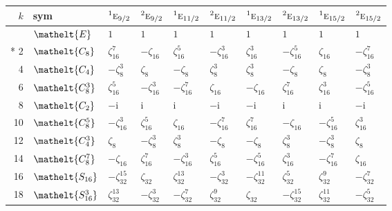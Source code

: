 \documentclass[10pt,a4paper]{article}
\numberwithin{equation}{section}
\newcommand{\eltfont}[1]{{\let\sigma\eltsigma\mathelt{#1}}}
\newcommand{\irr}[1]{\text{\normalfont\scshape #1}}
\newcommand{\conjpair}[1]{{}^{#1}}
\newcommand{\cls}[1]{\eltfont{#1}}
\newcommand{\iunit}{\mathrm{i}}
\newcommand{\rootunity}[1]{\zeta_{#1}}
\begin{document}
{\small\setlength{\tabcolsep}{4pt}
\begin{longtable}{@{}rlllllllll@{}}\toprule
$k$ & sym & $\conjpair{1}\irr{e}_{9/2}$ & $\conjpair{2}\irr{e}_{9/2}$ & $\conjpair{1}\irr{e}_{11/2}$ & $\conjpair{2}\irr{e}_{11/2}$ & $\conjpair{1}\irr{e}_{13/2}$ & $\conjpair{2}\irr{e}_{13/2}$ & $\conjpair{1}\irr{e}_{15/2}$ & $\conjpair{2}\irr{e}_{15/2}$\\\midrule\endhead
\bottomrule\endfoot\endlastfoot
0 & $\cls{E}$ & $1$ & $1$ & $1$ & $1$ & $1$ & $1$ & $1$ & $1$\\*
2 & $\cls{C_{8}}$ & $\rootunity{16}^{7}$ & $-\rootunity{16}$ & $\rootunity{16}^{5}$ & $-\rootunity{16}^{3}$ & $\rootunity{16}^{3}$ & $-\rootunity{16}^{5}$ & $\rootunity{16}$ & $-\rootunity{16}^{7}$\\
4 & $\cls{C_{4}}$ & $-\rootunity{8}^{3}$ & $\rootunity{8}$ & $-\rootunity{8}$ & $\rootunity{8}^{3}$ & $\rootunity{8}^{3}$ & $-\rootunity{8}$ & $\rootunity{8}$ & $-\rootunity{8}^{3}$\\
6 & $\cls{C_{8}^{3}}$ & $\rootunity{16}^{5}$ & $-\rootunity{16}^{3}$ & $-\rootunity{16}^{7}$ & $\rootunity{16}$ & $-\rootunity{16}$ & $\rootunity{16}^{7}$ & $\rootunity{16}^{3}$ & $-\rootunity{16}^{5}$\\
8 & $\cls{C_{2}}$ & $-\iunit{}$ & $\iunit{}$ & $\iunit{}$ & $-\iunit{}$ & $-\iunit{}$ & $\iunit{}$ & $\iunit{}$ & $-\iunit{}$\\
10 & $\cls{C_{8}^{5}}$ & $-\rootunity{16}^{3}$ & $\rootunity{16}^{5}$ & $\rootunity{16}$ & $-\rootunity{16}^{7}$ & $\rootunity{16}^{7}$ & $-\rootunity{16}$ & $-\rootunity{16}^{5}$ & $\rootunity{16}^{3}$\\
12 & $\cls{C_{4}^{3}}$ & $\rootunity{8}$ & $-\rootunity{8}^{3}$ & $\rootunity{8}^{3}$ & $-\rootunity{8}$ & $-\rootunity{8}$ & $\rootunity{8}^{3}$ & $-\rootunity{8}^{3}$ & $\rootunity{8}$\\
14 & $\cls{C_{8}^{7}}$ & $-\rootunity{16}$ & $\rootunity{16}^{7}$ & $-\rootunity{16}^{3}$ & $\rootunity{16}^{5}$ & $-\rootunity{16}^{5}$ & $\rootunity{16}^{3}$ & $-\rootunity{16}^{7}$ & $\rootunity{16}$\\
16 & $\cls{S_{16}}$ & $-\rootunity{32}^{15}$ & $\rootunity{32}$ & $\rootunity{32}^{13}$ & $-\rootunity{32}^{3}$ & $-\rootunity{32}^{11}$ & $\rootunity{32}^{5}$ & $\rootunity{32}^{9}$ & $-\rootunity{32}^{7}$\\
18 & $\cls{S_{16}^{3}}$ & $\rootunity{32}^{13}$ & $-\rootunity{32}^{3}$ & $-\rootunity{32}^{7}$ & $\rootunity{32}^{9}$ & $\rootunity{32}$ & $-\rootunity{32}^{15}$ & $\rootunity{32}^{11}$ & $-\rootunity{32}^{5}$\\

\end{longtable}}
\end{document}
